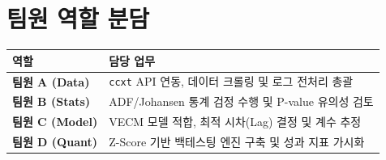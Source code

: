 \documentclass[11pt, a4paper]{article}
\begin{document}
	\section{팀원 역할 분담}
	\begin{table}[h]
		\centering
		\begin{tabular}{ll}
			\toprule
			\textbf{역할} & \textbf{담당 업무} \\ \midrule
			\textbf{팀원 A (Data)} & \texttt{ccxt} API 연동, 데이터 크롤링 및 로그 전처리 총괄 \\
			\textbf{팀원 B (Stats)} & ADF/Johansen 통계 검정 수행 및 P-value 유의성 검토 \\
			\textbf{팀원 C (Model)} & VECM 모델 적합, 최적 시차(Lag) 결정 및 계수 추정 \\
			\textbf{팀원 D (Quant)} & Z-Score 기반 백테스팅 엔진 구축 및 성과 지표 가시화 \\ \bottomrule
		\end{tabular}
	\end{table}
	
\end{document}
